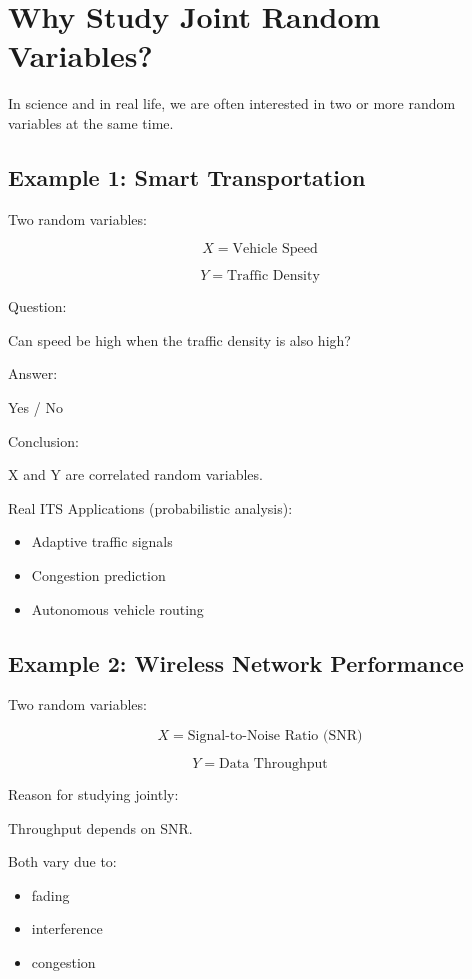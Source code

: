 \documentclass[11pt]{article}
\begin{document}
\section{Why Study Joint Random Variables?}

In science and in real life, we are often interested in two or more random variables at the same time.

\subsection{Example 1: Smart Transportation}

Two random variables:

\[
X = \text{Vehicle Speed}
\]

\[
Y = \text{Traffic Density}
\]

Question:

Can speed be high when the traffic density is also high?

Answer:

Yes / No

Conclusion:

X and Y are correlated random variables.

Real ITS Applications (probabilistic analysis):

\begin{itemize}
\item Adaptive traffic signals
\item Congestion prediction
\item Autonomous vehicle routing
\end{itemize}

\subsection{Example 2: Wireless Network Performance}

Two random variables:

\[
X = \text{Signal-to-Noise Ratio (SNR)}
\]

\[
Y = \text{Data Throughput}
\]

Reason for studying jointly:

Throughput depends on SNR.

Both vary due to:

\begin{itemize}
\item fading
\item interference
\item congestion
\end{itemize}
\end{document}
